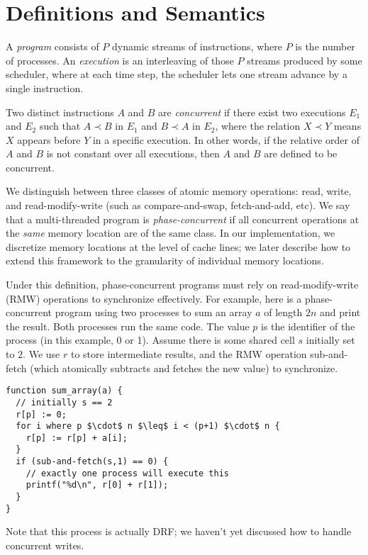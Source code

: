 \documentclass{article}
\begin{document}
\section{Definitions and Semantics}

A \textit{program} consists of $P$ dynamic streams of instructions, where $P$ is the number of processes. An \textit{execution} is an interleaving of those $P$ streams produced by some scheduler, where at each time step, the scheduler lets one stream advance by a single instruction.

Two distinct instructions $A$ and $B$ are \textit{concurrent} if there exist two executions $E_1$ and $E_2$ such that $A \prec B$ in $E_1$ and $B \prec A$ in $E_2$, where the relation $X \prec Y$ means $X$ appears before $Y$ in a specific execution. In other words, if the relative order of $A$ and $B$ is not constant over all executions, then $A$ and $B$ are defined to be concurrent.

We distinguish between three classes of atomic memory operations: read, write, and read-modify-write (such as compare-and-swap, fetch-and-add, etc). We say that a multi-threaded program is \textit{phase-concurrent} if all concurrent operations at the \textit{same} memory location are of the same class. In our implementation, we discretize memory locations at the level of cache lines; we later describe how to extend this framework to the granularity of individual memory locations. 

Under this definition, phase-concurrent programs must rely on read-modify-write (RMW) operations to synchronize effectively. For example, here is a phase-concurrent program using two processes to sum an array $a$ of length $2n$ and print the result. Both processes run the same code. The value $p$ is the identifier of the process (in this example, 0 or 1). Assume there is some shared cell $s$ initially set to $2$. We use $r$ to store intermediate results, and the RMW operation sub-and-fetch (which atomically subtracts and fetches the new value) to synchronize.

\begin{lstlisting}
function sum_array(a) {
  // initially s == 2
  r[p] := 0;
  for i where p $\cdot$ n $\leq$ i < (p+1) $\cdot$ n {
  	r[p] := r[p] + a[i];
  }
  if (sub-and-fetch(s,1) == 0) {
  	// exactly one process will execute this
  	printf("%d\n", r[0] + r[1]);
  }
}
\end{lstlisting}

Note that this process is actually DRF; we haven't yet discussed how to handle concurrent writes.
\end{document}
